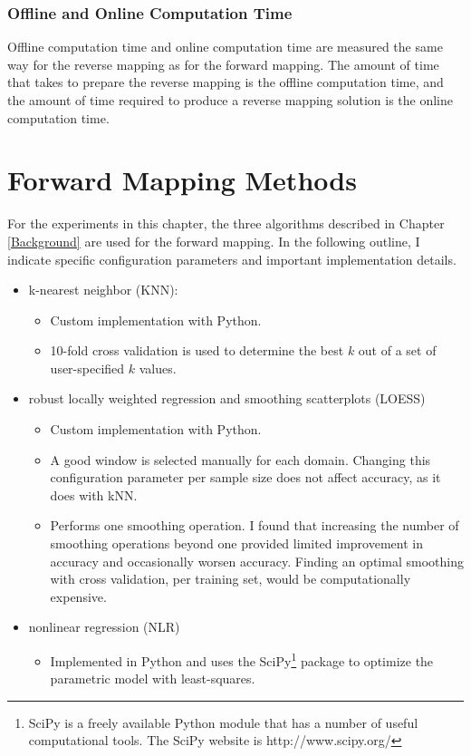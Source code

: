   \subsubsection{Offline and Online Computation Time}
Offline computation time and online computation time are measured the same way for the reverse mapping as for the forward mapping.
The amount of time that \fw takes to prepare the reverse mapping is the offline computation time, and the amount of time required to produce a reverse mapping solution is the online computation time.



\section{Forward Mapping Methods}\label{sec:fmalgo}

For the experiments in this chapter, the three algorithms described in Chapter \ref{Background} are used for the forward mapping. In the following outline, I indicate specific configuration parameters and important implementation details.
\begin{itemize}
 \item k-nearest neighbor (KNN):
  \begin{itemize}
   \item Custom implementation with Python.
   \item 10-fold cross validation is used to determine the best $k$ out of a set of user-specified $k$ values.
  \end{itemize}

 \item robust locally weighted regression and smoothing scatterplots (LOESS)
  \begin{itemize}
   \item Custom implementation with Python.
   \item A good window is selected manually for each domain. Changing this configuration parameter per sample size does not affect accuracy, as it does with kNN.
   \item Performs one smoothing operation. I found that increasing the number of smoothing operations beyond one provided limited improvement in accuracy and occasionally worsen accuracy. Finding an optimal smoothing with cross validation, per training set, would be computationally expensive.
  \end{itemize}

 \item nonlinear regression (NLR)
   \begin{itemize}
      \item Implemented in Python and uses the SciPy\footnote{SciPy is a freely available Python module that has a number of useful computational tools. The SciPy website is http://www.scipy.org/} package to optimize the parametric model with least-squares.
   \end{itemize}

\end{itemize}


